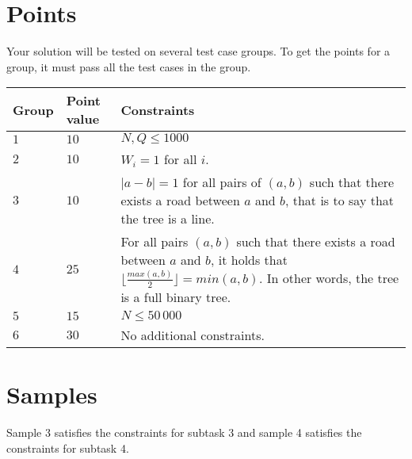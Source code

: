 \section*{Points}
Your solution will be tested on several test case groups.
To get the points for a group, it must pass all the test cases in the group.

\noindent
\begin{tabular}{| l | l | p{12cm} |}
  \hline
  \textbf{Group} & \textbf{Point value} & \textbf{Constraints} \\ \hline
  $1$    & $10$       & $N, Q \leq 1000$ \\ \hline
  $2$    & $10$       & $W_i=1$ for all $i$. \\ \hline
  $3$    & $10$       & $|a-b|=1$ for all pairs of $(a,b)$ such that there exists a road between $a$ and $b$, that is to say that the tree is a line. \\ \hline
  $4$    & $25$       & For all pairs $(a,b)$ such that there exists a road between $a$ and $b$, it holds that $\lfloor\frac{max(a,b)}{2} \rfloor=min(a,b)$.
  In other words, the tree is a full binary tree. \\ \hline
  $5$    & $15$       & $N \leq 50\,000$ \\ \hline
  $6$    & $30$       & No additional constraints. \\ \hline
\end{tabular}

\section*{Samples}
Sample 3 satisfies the constraints for subtask 3 and sample 4 satisfies the constraints for subtask 4.
